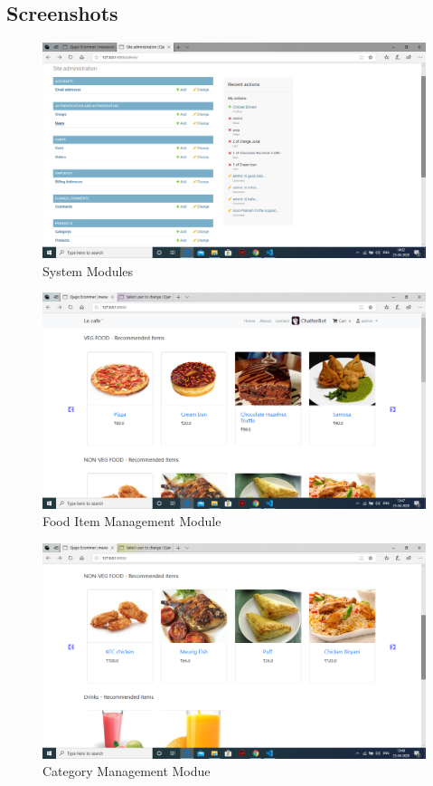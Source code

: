 \documentclass[12pt,a4paper]{report}
\begin{document}
\begin{appendices}
	\chapter{Screenshots}
	\begin{figure}[h!]
		\centering
		\includegraphics[scale=0.3]{12}
		\caption{System Modules}
		\label{Architecture}
		\end{figure}

\begin{figure}[h!]
	\centering
	\includegraphics[scale=0.3]{1}
	\caption{Food Item Management Module}
	\label{Architecture}
\end{figure}

\begin{figure}[h!]
	\centering
	\includegraphics[scale=0.3]{2}
	\caption{Category Management Modue}
	\label{Architecture}
\end{figure}


\end{appendices}
\end{document}
